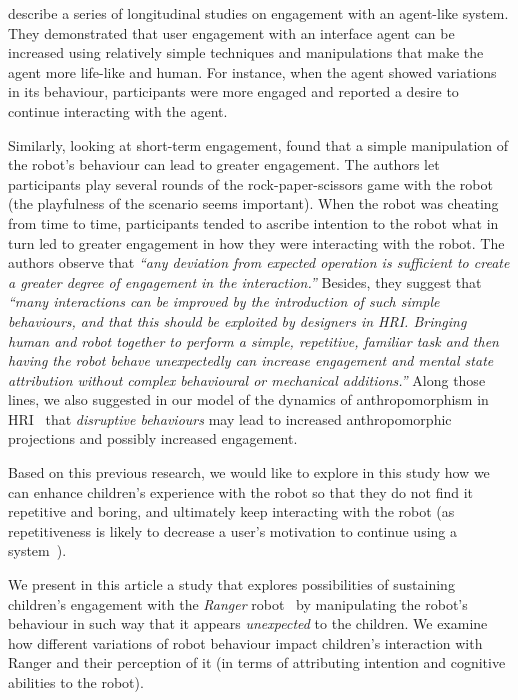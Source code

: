 \documentclass[letterpaper, 10pt, conference]{ieeeconf}
\begin{document}
\cite{bickmore_maintaining_2010} describe a series of longitudinal studies on
engagement with an agent-like system. They demonstrated that user engagement
with an interface agent can be increased using relatively simple techniques and
manipulations that make the agent more life-like and human. For instance, when
the agent showed variations in its behaviour, participants were more engaged and
reported a desire to continue interacting with the agent.

Similarly, looking at short-term engagement, \cite{short_no_2010} found that a
simple manipulation of the robot's behaviour can lead to greater engagement. The
authors let participants play several rounds of the rock-paper-scissors game
with the robot (the playfulness of the scenario seems important). When the robot
was cheating from time to time, participants tended to ascribe intention to the
robot what in turn led to greater engagement in how they were interacting with
the robot. The authors observe that \textit{``any deviation from expected
operation is sufficient to create a greater degree of engagement in the
interaction.''} Besides, they suggest that \textit{``many interactions can be
improved by the introduction of such simple behaviours, and that this should
be exploited by designers in HRI. Bringing human and robot together to
perform a simple, repetitive, familiar task and then having the robot behave
unexpectedly can increase engagement and mental state attribution without
complex behavioural or mechanical additions.''}  Along those lines, we also
suggested in our model of the dynamics of anthropomorphism in
HRI~\cite{lemaignan2014dynamics} that \emph{disruptive behaviours} may lead to
increased anthropomorphic projections and possibly increased engagement.

Based on this previous research, we would like to explore in this study how
we can enhance children's experience with the robot so that they do not find it
repetitive and boring, and ultimately keep interacting with the robot (as
repetitiveness is likely to decrease a user's motivation to continue using a
system~\cite{bickmore_establishing_2005}).

We present in this article a study that explores possibilities of sustaining
children's engagement with the \emph{Ranger} robot~\cite{mondada2014ranger} by
manipulating the robot's behaviour in such way that it appears
\textit{unexpected} to the children. We examine how different variations of
robot behaviour impact children's interaction with Ranger and their perception of
it (in terms of attributing intention and cognitive abilities to the robot).
\end{document}
